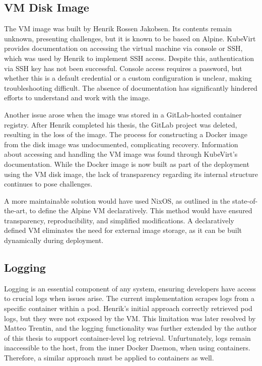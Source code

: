 \subsection{VM Disk Image}
The VM image was built by Henrik Rossen Jakobsen. Its contents remain unknown, presenting challenges, but it is known to be based on Alpine. KubeVirt provides documentation on accessing the virtual machine via console or SSH, which was used by Henrik to implement SSH access. Despite this, authentication via SSH key has not been successful. Console access requires a password, but whether this is a default credential or a custom configuration is unclear, making troubleshooting difficult. The absence of documentation has significantly hindered efforts to understand and work with the image.

Another issue arose when the image was stored in a GitLab-hosted container registry. After Henrik completed his thesis, the GitLab project was deleted, resulting in the loss of the image. The process for constructing a Docker image from the disk image was undocumented, complicating recovery. Information about accessing and handling the VM image was found through KubeVirt's documentation. While the Docker image is now built as part of the deployment using the VM disk image, the lack of transparency regarding its internal structure continues to pose challenges.

A more maintainable solution would have used NixOS, as outlined in the state-of-the-art, to define the Alpine VM declaratively. This method would have ensured transparency, reproducibility, and simplified modifications. A declaratively defined VM eliminates the need for external image storage, as it can be built dynamically during deployment.

\subsection{Logging} 
Logging is an essential component of any system, ensuring developers have access to crucial logs when issues arise. The current implementation scrapes logs from a specific container within a pod. Henrik's initial approach correctly retrieved pod logs, but they were not exposed by the VM. This limitation was later resolved by Matteo Trentin, and the logging functionality was further extended by the author of this thesis to support container-level log retrieval. Unfurtunately, logs remain inaccessible to the host, from the inner Docker Daemon, when using containers. Therefore, a similar approach must be applied to containers as well.

